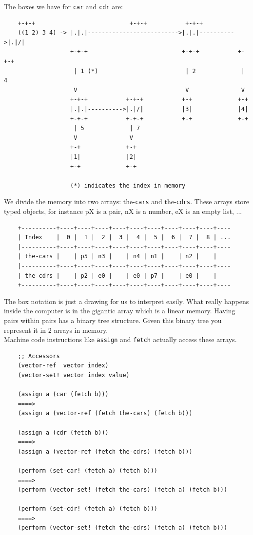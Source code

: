 \documentclass[a4paper,twoside]{article}
\numberwithin{equation}{section}
\begin{document}
The boxes we have for \texttt{car} and \texttt{cdr} are:
\begin{lstlisting}
    +-+-+                           +-+-+           +-+-+
    ((1 2) 3 4) -> |.|.|-------------------------->|.|.|---------->|.|/|
                   +-+-+                           +-+-+           +-+-+
                    | 1 (*)                         | 2             | 4
                    V                               V               V
                   +-+-+           +-+-+           +-+             +-+
                   |.|.|---------->|.|/|           |3|             |4|
                   +-+-+           +-+-+           +-+             +-+
                    | 5             | 7
                    V               V
                   +-+             +-+
                   |1|             |2|
                   +-+             +-+
    
                   (*) indicates the index in memory
\end{lstlisting}
We divide the memory into two arrays: the-\texttt{cars} and the-\texttt{cdrs}.
These arrays store typed objects, for instance pX is a pair, nX is a number, eX is an empty list, ...
\begin{lstlisting}
    +----------+----+----+----+----+----+----+----+----+----+----
    | Index    |  0 |  1 |  2 |  3 |  4 |  5 |  6 |  7 |  8 | ...
    |----------+----+----+----+----+----+----+----+----+----+----
    | the-cars |    | p5 | n3 |    | n4 | n1 |    | n2 |    |
    |----------+----+----+----+----+----+----+----+----+----+----
    | the-cdrs |    | p2 | e0 |    | e0 | p7 |    | e0 |    |
    +----------+----+----+----+----+----+----+----+----+----+----
\end{lstlisting}
The box notation is just a drawing for us to interpret easily. What really happens inside the computer
is in the gigantic array which is a linear memory. Having pairs within pairs has a binary tree structure.
Given this binary tree you represent it in 2 arrays in memory. \\
Machine code instructions like \texttt{assign} and \texttt{fetch} actually access these arrays.
\begin{lstlisting}
    ;; Accessors
    (vector-ref  vector index)
    (vector-set! vector index value)
    
    (assign a (car (fetch b)))
    ====>
    (assign a (vector-ref (fetch the-cars) (fetch b)))
    
    (assign a (cdr (fetch b)))
    ====>
    (assign a (vector-ref (fetch the-cdrs) (fetch b)))
    
    (perform (set-car! (fetch a) (fetch b)))
    ====>
    (perform (vector-set! (fetch the-cars) (fetch a) (fetch b)))
    
    (perform (set-cdr! (fetch a) (fetch b)))
    ====>
    (perform (vector-set! (fetch the-cdrs) (fetch a) (fetch b)))
\end{lstlisting}
\end{document}
